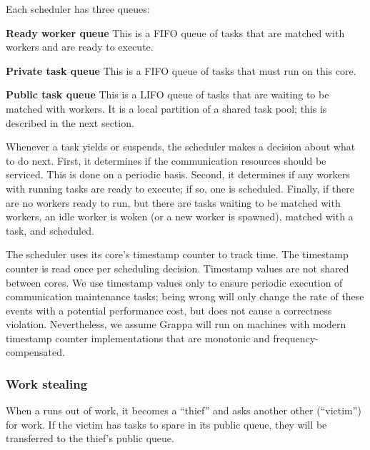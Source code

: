 Each scheduler has three queues:
\begin{description}
\item{\bf Ready worker queue} This is a FIFO queue of tasks that are
  matched with workers and are ready to execute.
\item{\bf Private task queue} This is a FIFO queue of tasks that must run on this core.
\item{\bf Public task queue} This is a LIFO queue of tasks that are
  waiting to be matched with workers. It is a local partition of a shared
  task pool; this is described in the next section.
\end{description}

Whenever a task yields or suspends, the scheduler makes a decision
about what to do next. First, it determines if
the communication resources should be serviced. This is done on a
periodic basis. Second, it determines if any workers with running
tasks are ready to execute; if so, one is scheduled. Finally, if there
are no workers ready to run, but there are tasks waiting to be matched
with workers, an idle worker is woken (or a new worker is spawned),
matched with a task, and scheduled.

The scheduler uses its core's timestamp counter to track time. The
timestamp counter is read once per scheduling decision. Timestamp
values are not shared between cores. We use timestamp values only to
ensure periodic execution of communication maintenance tasks; being
wrong will only change the rate of these events with a potential
performance cost, but does not cause a correctness violation. Nevertheless, we
assume Grappa will run on machines with modern timestamp counter
implementations that are monotonic and frequency-compensated.

\subsubsection{Work stealing} \label{subsec:implementation-worksteal}
When a  runs
out of work, it becomes a ``thief'' and asks another other
 (``victim'') for work. If the victim has tasks
to spare in its public queue, they will be transferred to the thief's public queue.

